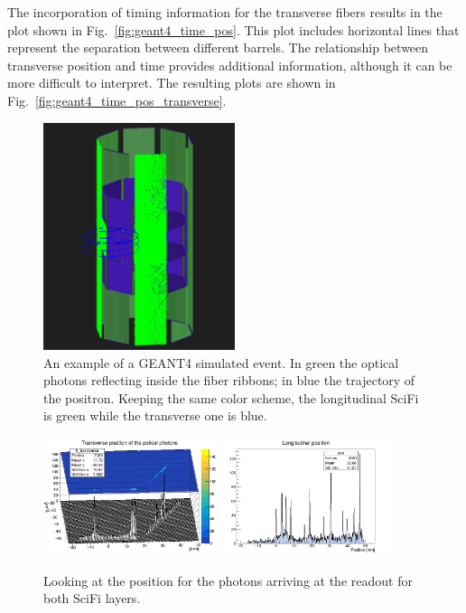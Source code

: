 \begin{refsection}
        The incorporation of timing information for the transverse fibers results in the plot shown in Fig.~\ref{fig:geant4_time_pos}. This plot includes horizontal lines that represent the separation between different barrels. The relationship between transverse position and time provides additional information, although it can be more difficult to interpret. The resulting plots are shown in Fig.~\ref{fig:geant4_time_pos_transverse}.

        \begin{figure}
            \centering
            \includegraphics[width=0.5\textwidth]{Figures/muEDM/Tracker/muedm_scifi_B.png}
            \caption{An example of a \textsc{GEANT4} simulated event. In green the optical photons reflecting inside the fiber ribbons; in blue the trajectory of the positron. Keeping the same color scheme, the longitudinal SciFi is green while the transverse one is blue.}
        \label{fig:geant4_B}
        \end{figure}

        \begin{figure}
            \centering
            \includegraphics[width=0.45\textwidth]{Figures/muEDM/Tracker/fPosInXfPosInZ.png}
            \includegraphics[width=0.45\textwidth]{Figures/muEDM/Tracker/fPosInY.png}
            \caption{Looking at the position for the photons arriving at the readout for both SciFi layers.}
        \label{fig:geant4_position}
        \end{figure}
    

\end{refsection}

